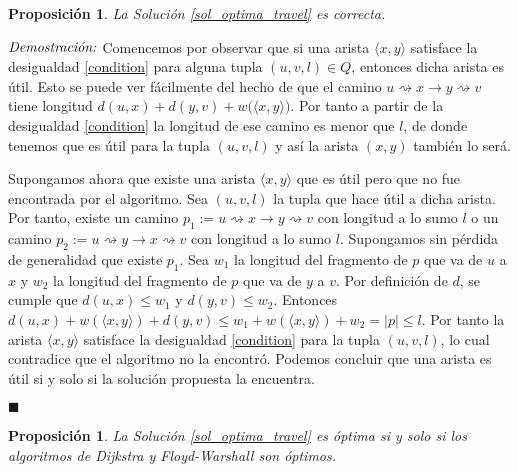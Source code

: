 \documentclass[10pt]{amsart}
\newtheorem{prop}[theorem]{Proposici\'on}
\theoremstyle{definition}
\numberwithin{equation}{section}
\newcommand{\lqqd}{{\small $\blacksquare$}}
\newcommand{\Proof}[2]{{\vspace{1em} $\emph{Demostración:}$ \textbf{#1} #2 \lqqd \vspace{1em}}}
\newcommand{\edge}[1]{\langle #1\rangle}
\begin{document}
\begin{prop}
	La Soluci\'on \ref{sol_optima_travel} es correcta.
\end{prop}
	\Proof{}{
		Comencemos por observar que si una arista $\edge{x,y}$ satisface la desigualdad \eqref{condition} para alguna tupla $(u,v,l) \in Q$, entonces dicha arista es \'util. Esto se puede ver f\'acilmente del hecho de que el camino $u\rightsquigarrow x \rightarrow y\rightsquigarrow v$ tiene longitud $d(u,x) + d(y,v) + w\big( \edge{x,y} \big)$. Por tanto a partir de la desigualdad \eqref{condition} la longitud de ese camino es menor que $l$, de donde tenemos que es \'util para la tupla $(u,v,l)$ y as\'i la arista $(x,y)$ tambi\'en lo ser\'a.
		
		Supongamos ahora que existe una arista $\edge{x, y}$ que es \'util pero que no fue encontrada por el algoritmo. Sea $(u, v, l)$ la tupla que hace \'util a dicha arista. Por tanto, existe un camino $p_1 := u \rightsquigarrow x \rightarrow y \rightsquigarrow v$ con longitud a lo sumo $l$ o un camino $p_2 := u \rightsquigarrow y \rightarrow x \rightsquigarrow v$ con longitud a lo sumo $l$. Supongamos sin p\'erdida de generalidad que existe $p_1$. Sea $w_1$ la longitud del fragmento de $p$ que va de $u$ a $x$ y $w_2$ la longitud del fragmento de $p$ que va de $y$ a $v$. Por definici\'on de $d$, se cumple que $d(u,x) \le w_1$ y $d(y, v) \le w_2$. Entonces $d(u,x) + w(\edge{x, y}) + d(y , v) \le w_1 + w(\edge{x,y}) + w_2 = |p| \le l$. Por tanto la arista $\edge{x, y}$ satisface la desigualdad \eqref{condition} para la tupla $(u,v,l)$, lo cual contradice que el algoritmo no la encontr\'o. Podemos concluir que una arista es \'util si y solo si la soluci\'on propuesta la encuentra.
		
	}

\begin{prop}
	La Soluci\'on \ref{sol_optima_travel} es \'optima si y solo si los algoritmos de Dijkstra y Floyd-Warshall son \'optimos.
\end{prop}
\end{document}
